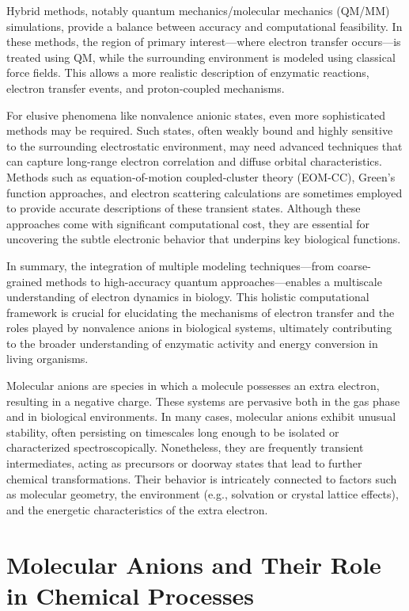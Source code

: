Hybrid methods, notably quantum mechanics/molecular mechanics (QM/MM) simulations, provide a balance between accuracy and computational feasibility. In these methods, the region of primary interest—where electron transfer occurs—is treated using QM, while the surrounding environment is modeled using classical force fields. This allows a more realistic description of enzymatic reactions, electron transfer events, and proton-coupled mechanisms.

For elusive phenomena like nonvalence anionic states, even more sophisticated methods may be required. Such states, often weakly bound and highly sensitive to the surrounding electrostatic environment, may need advanced techniques that can capture long-range electron correlation and diffuse orbital characteristics. Methods such as equation-of-motion coupled-cluster theory (EOM-CC), Green's function approaches, and electron scattering calculations are sometimes employed to provide accurate descriptions of these transient states. Although these approaches come with significant computational cost, they are essential for uncovering the subtle electronic behavior that underpins key biological functions.

In summary, the integration of multiple modeling techniques—from coarse-grained methods to high-accuracy quantum approaches—enables a multiscale understanding of electron dynamics in biology. This holistic computational framework is crucial for elucidating the mechanisms of electron transfer and the roles played by nonvalence anions in biological systems, ultimately contributing to the broader understanding of enzymatic activity and energy conversion in living organisms.

Molecular anions are species in which a molecule possesses an extra electron, resulting in a negative charge. These systems are pervasive both in the gas phase and in biological environments. In many cases, molecular anions exhibit unusual stability, often persisting on timescales long enough to be isolated or characterized spectroscopically. Nonetheless, they are frequently transient intermediates, acting as precursors or doorway states that lead to further chemical transformations. Their behavior is intricately connected to factors such as molecular geometry, the environment (e.g., solvation or crystal lattice effects), and the energetic characteristics of the extra electron.

\section{Molecular Anions and Their Role in Chemical Processes}

